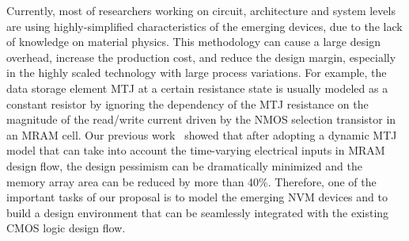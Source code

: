 Currently, most of researchers working on circuit, architecture and system levels are using highly-simplified characteristics of the emerging devices, due to the lack of knowledge on material physics. This methodology can cause a large design overhead, increase the production cost, and reduce the design margin, especially in the highly scaled technology with large process variations.  For example, the data storage element MTJ at a certain resistance state is usually modeled as a constant resistor by ignoring the dependency of the MTJ resistance on the magnitude of the read/write current driven by the NMOS selection transistor in an MRAM cell. Our previous work~\cite{Chen08} showed that after adopting a dynamic MTJ model that can take into account the time-varying electrical inputs in MRAM design flow, the design pessimism can be dramatically minimized and the memory array area can be reduced by more than 40\%. Therefore, one of the important tasks of our proposal is to model the emerging NVM devices and to build a design environment that can be seamlessly integrated with the existing CMOS logic design flow.

